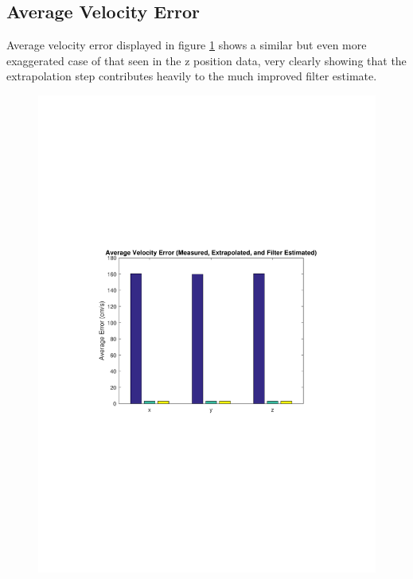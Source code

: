 \subsection{Average Velocity Error}
Average velocity error displayed in figure \ref{fig:analysisvelocity} shows a similar but even more exaggerated case of that seen in the z position data, very clearly showing that the extrapolation step contributes heavily to the much improved filter estimate. 

\begin{figure}[ht]
	\centering
	\includegraphics[height=0.40\textheight,trim={3cm 9.9cm 3cm 9.5cm},clip]{analysisvelocity.pdf}
	\label{fig:analysisvelocity}
\end{figure}

